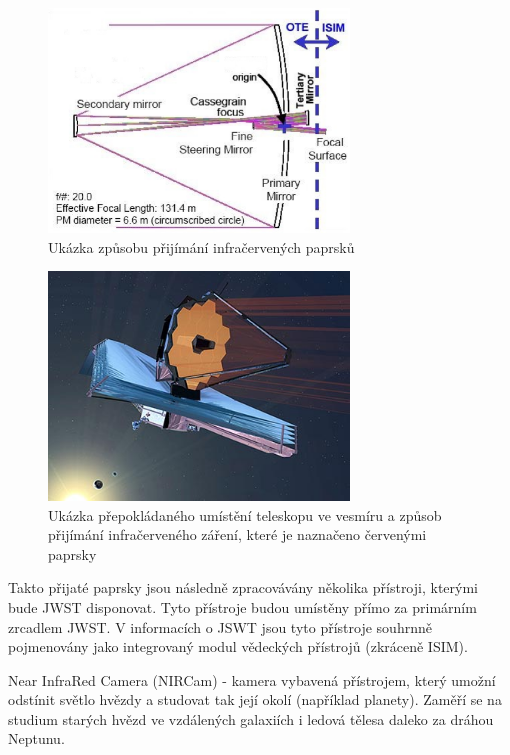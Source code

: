 \documentclass[a4paper,11pt]{article}
\begin{document}
\begin{figure}[h]
\begin{center}
\includegraphics[width=8cm]{webbPaprsky.eps}
\caption{Ukázka způsobu přijímání infračervených paprsků}
\label{paprskyWebb}
\end{center}
\end{figure}


\begin{figure}[h]
\begin{center}
\includegraphics[width=8cm]{webbPaprsky2.eps}
\caption{Ukázka přepokládaného umístění teleskopu ve vesmíru a způsob přijímání infračerveného záření, které je naznačeno červenými paprsky}
\label{paprskyWebb2}
\end{center}
\end{figure}

Takto přijaté paprsky jsou následně zpracovávány několika přístroji, kterými bude JWST disponovat. Tyto přístroje budou umístěny přímo za primárním zrcadlem JWST. V informacích o JSWT jsou tyto přístroje souhrnně pojmenovány jako integrovaný modul vědeckých přístrojů (zkráceně ISIM). 

Near InfraRed Camera (NIRCam) - kamera vybavená přístrojem, který umožní odstínit světlo hvězdy a studovat tak její okolí (například planety). Zaměří se na studium starých hvězd ve vzdálených galaxiích i ledová tělesa daleko za dráhou Neptunu.
\end{document}
